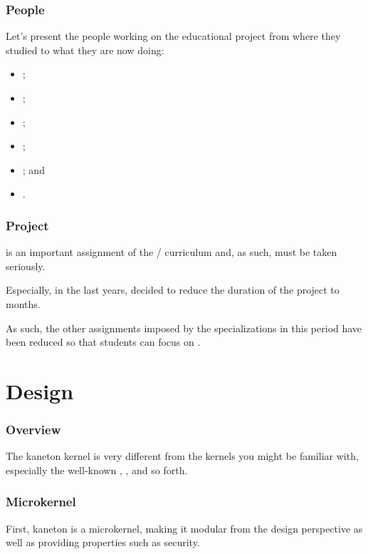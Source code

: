 
\begin{frame}
  \frametitle{People}

  Let's present the people working on the educational project from where they
  studied to what they are now doing:

  \begin{itemize}
    \item
      ;
    \item
      ;
    \item
      ;
    \item
      ;
    \item
      ; and
    \item
      .
  \end{itemize}
\end{frame}


\begin{frame}
  \frametitle{Project}

   is an important assignment of the /
  curriculum and, as such, must be taken seriously.

  \-

  Especially, in the last years,  decided to reduce the duration
  of the project to  months.

  \-

  As such, the other assignments imposed by the specializations in this
  period have been reduced so that students can focus on .
\end{frame}

%
%

\section{Design}


\begin{frame}
  \frametitle{Overview}

  The kaneton kernel is very different from the kernels you might be
  familiar with, especially the well-known , ,
   and so forth.
\end{frame}


\begin{frame}
  \frametitle{Microkernel}

  First, kaneton is a microkernel, making it modular from the design
  perspective as well as providing properties such as security.
\end{frame}

